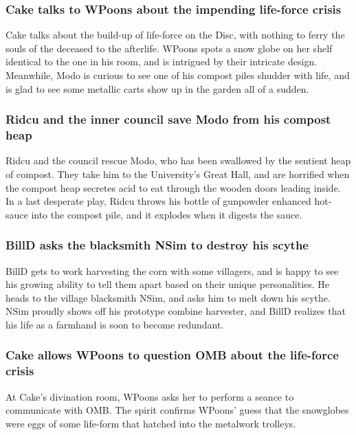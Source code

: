 \subsubsection{\Gls{Cake} talks to \Gls{WPoons} about the impending life-force crisis}
\Gls{Cake} talks about the build-up of life-force on the Disc, with nothing to ferry the souls of
the deceased to the afterlife. \Gls{WPoons} spots a snow globe on her shelf identical to the one in
his room, and is intrigued by their intricate design. Meanwhile, \Gls{Modo} is curious to see one
of his compost piles shudder with life, and is glad to see some metallic carts show up in the
garden all of a sudden.

\subsubsection{\Gls{Ridcu} and the inner council save \Gls{Modo} from his compost heap}
\Gls{Ridcu} and the council rescue \Gls{Modo}, who has been swallowed by the sentient heap of
compost. They take him to the University's Great Hall, and are horrified when the compost heap
secretes acid to eat through the wooden doors leading inside. In a last desperate play, \Gls{Ridcu}
throws his bottle of gunpowder enhanced hot-sauce into the compost pile, and it explodes when it
digests the sauce.

\subsubsection{\Gls{BillD} asks the blacksmith \Gls{NSim} to destroy his scythe}
\Gls{BillD} gets to work harvesting the corn with some villagers, and is happy to see his growing
ability to tell them apart based on their unique personalities. He heads to the village blacksmith
\Gls{NSim}, and asks him to melt down his scythe. \Gls{NSim} proudly shows off his prototype
combine harvester, and \Gls{BillD} realizes that his life as a farmhand is soon to become redundant.

\subsubsection{\Gls{Cake} allows \Gls{WPoons} to question \Gls{OMB} about the life-force crisis}
At \Gls{Cake}'s divination room, \Gls{WPoons} asks her to perform a seance to communicate with
\Gls{OMB}. The spirit confirms \Gls{WPoons}' guess that the snowglobes were eggs of some life-form
that hatched into the metalwork trolleys.

